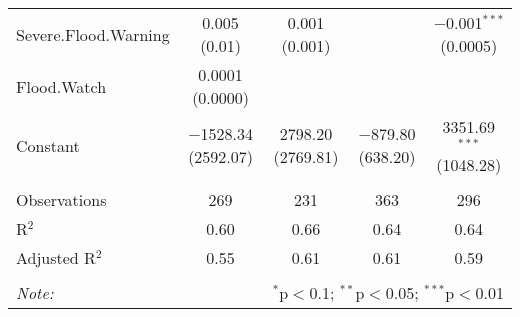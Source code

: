 \documentclass[12pt,letterpaper]{article}
\begin{document}
\begin{table}[!htbp]
\begin{adjustbox}{width=\textwidth}
\begin{tabular}{@{\extracolsep{5pt}}lcccc}
			Severe.Flood.Warning & 0.005 (0.01) & 0.001 (0.001) &  & $-$0.001$^{***}$ (0.0005) \\ 
			Flood.Watch & 0.0001 (0.0000) &  &  &  \\ 
			Constant & $-$1528.34 (2592.07) & 2798.20 (2769.81) & $-$879.80 (638.20) & 3351.69$^{***}$ (1048.28) \\ 
			\hline \\[-1.8ex] 
			Observations & 269 & 231 & 363 & 296 \\ 
			R$^{2}$ & 0.60 & 0.66 & 0.64 & 0.64 \\ 
			Adjusted R$^{2}$ & 0.55 & 0.61 & 0.61 & 0.59 \\ 
			\hline 
			\hline \\[-1.8ex] 
			\textit{Note:}  & \multicolumn{4}{r}{$^{*}$p$<$0.1; $^{**}$p$<$0.05; $^{***}$p$<$0.01} \\  
		\end{tabular} 
	\end{adjustbox}
\end{table}


\end{document}
